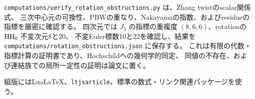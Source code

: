 \texttt{computations/verify\_rotation\_obstructions.py} は、Zhang twistのscalar関係式、
三次中心元の可換性、PBWの重なり、Nakayamaの指数、およびresidueの指標を厳密に確認する。
四次元では \(J_3\) の指標の重複度 \((8,6,6)\)、rotationの \(\operatorname{HH}_0\) 不変次元8と20、
不変Euler標数10と22を確認し、結果を
\texttt{computations/rotation\_obstructions.json} に保存する。
これは有限の代数・指標計算の証明書であり、Hochschildへの幾何学的同定、
同値の不存在、および連結族での局所一定性の証明は論文に置く。

組版にはLuaLaTeX、\texttt{ltjsarticle}、標準の数式・リンク関連パッケージを使う。

\begingroup
\small

\endgroup

